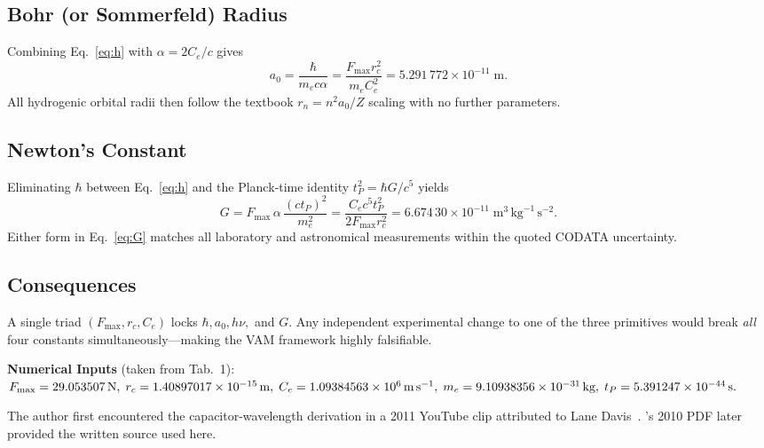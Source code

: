 \documentclass[12pt]{article}
\begin{document}
    \subsection{Bohr (or Sommerfeld) Radius}
    Combining Eq.~\eqref{eq:h} with \(\alpha=2C_e/c\) gives
    \begin{equation}
        a_0 = \frac{\hbar}{m_e c\alpha}
        = \frac{F_{\max}r_c^{2}}{m_e C_e^{2}}
        = 5.291\,772\times10^{-11}\;\text{m}.
        \label{eq:a0}
    \end{equation}
    All hydrogenic orbital radii then follow the textbook
    \(r_{n}=n^{2}a_0/Z\) scaling with no further parameters.

    \subsection{Newton's Constant}
    Eliminating \(\hbar\) between Eq.~\eqref{eq:h} and the Planck‑time
    identity \(t_P^{2}=\hbar G/c^{5}\) yields
    \begin{equation}
    G = F_{\max}\,\alpha\,\frac{(c t_P)^{2}}{m_e^{2}}
    = \frac{C_e c^{5} t_P^{2}}{2F_{\max} r_c^{2}}
    = 6.674\,30\times10^{-11}\;\text{m}^{3}\,\text{kg}^{-1}\,\text{s}^{-2}.
    \label{eq:G}
    \end{equation}
    Either form in Eq.~\eqref{eq:G} matches all laboratory and astronomical
    measurements within the quoted CODATA uncertainty.

    \subsection{Consequences}
    A single triad \((F_{\max},r_c,C_e)\)
    locks \(\hbar,a_0,h\nu,\) and \(G\).
    Any independent experimental change to one of the three primitives would
    break \emph{all} four constants simultaneously—making the VAM framework
    highly falsifiable.

    \bigskip
    \noindent\textbf{Numerical Inputs}\; (taken from Tab.~1):
    \(F_{\max}=29.053507\,\text{N},\;r_c=1.40897017\times10^{-15}\,\text{m},\;
    C_e=1.09384563\times10^{6}\,\text{m\,s}^{-1},\;
    m_e=9.10938356\times10^{-31}\,\text{kg},\;
    t_P=5.391247\times10^{-44}\,\text{s}.\)


The author first encountered the capacitor-wavelength derivation in a 2011 YouTube clip attributed to Lane Davis~\cite{lan}. 's 2010 PDF later provided the written source used here.


\ifdefined\standalonechapter
\else
    
    
    
\end{document}
